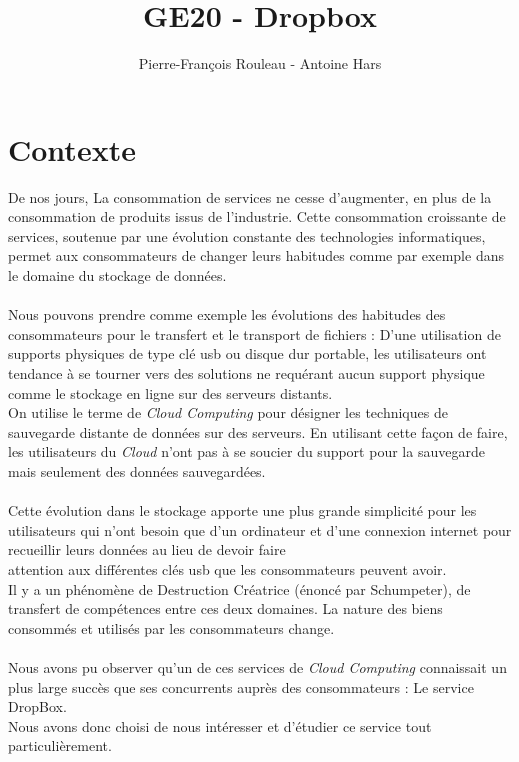 \documentclass[a4paper, 10pt]{article}
\title{GE20 - Dropbox}
\author{Pierre-François Rouleau - Antoine Hars}
\begin{document}
\maketitle

\section{Contexte}
De nos jours, La consommation de services ne cesse d'augmenter, en plus de la consommation de produits issus de l'industrie.
Cette consommation croissante de services, soutenue par une \'evolution constante des technologies informatiques, permet aux consommateurs
de changer leurs habitudes comme par exemple dans le domaine du stockage de donn\'ees.\\ \\
Nous pouvons prendre comme exemple les \'evolutions des habitudes des consommateurs pour le transfert et le transport de fichiers :
D'une utilisation de supports physiques de type cl\'e usb ou disque dur portable, les utilisateurs ont tendance \`a se tourner vers des solutions
ne requ\'erant aucun support physique comme le stockage en ligne sur des serveurs distants.\\
On utilise le terme de \textit{Cloud Computing} pour d\'esigner les techniques de sauvegarde distante de donn\'ees sur des serveurs.
En utilisant cette façon de faire, les utilisateurs du \textit{Cloud} n'ont pas \`a se soucier du support pour la sauvegarde mais
seulement des donn\'ees sauvegard\'ees.\\ \\
Cette \'evolution dans le stockage apporte une plus grande simplicit\'e pour les utilisateurs
qui n'ont besoin que d'un ordinateur et d'une connexion internet pour recueillir leurs donn\'ees
au lieu de devoir faire\\attention aux diff\'erentes cl\'es usb que les consommateurs peuvent avoir.\\
Il y a un ph\'enom\`ene de Destruction Cr\'eatrice (\'enonc\'e par Schumpeter), de transfert de comp\'etences entre ces deux domaines.
La nature des biens consomm\'es et utilis\'es par les consommateurs change.\\ \\
Nous avons pu observer qu'un de ces services de \textit{Cloud Computing} connaissait un plus large succ\`es
que ses concurrents aupr\`es des consommateurs : Le service DropBox.\\
Nous avons donc choisi de nous int\'eresser et d'\'etudier ce service tout particuli\`erement.\\ \\
\end{document}
